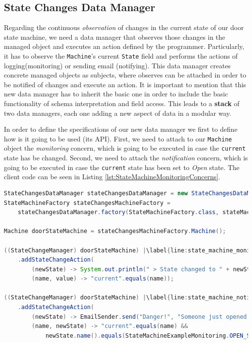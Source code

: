 \subsection{State Changes Data Manager}
Regarding the continuous \textit{observation} of changes in the current state of our door state machine, we need a data manager that observes those changes in the managed object and executes an action defined by the programmer.
Particularly, it has to observe the \texttt{Machine}'s current \texttt{State} field and performs the actions of logging(monitoring) or sending email (notifying).
This data manager creates concrete managed objects as subjects, where observes can be attached in order to be notified of changes and execute an action.
It is important to mention that this new data manager has to inherit the basic one in order to include the basic functionality of schema interpretation and field access.
This leads to a \textbf{stack} of two data managers, each one adding a new aspect of data in a modular way.

In order to define the specifications of our new data manager we first to define how is it going to be used (its API).
First, we need to attach to our \texttt{Machine} object the \textit{monitoring} concern, which is going to be executed in case the \texttt{current} state has be changed.
Second, we need to attach the \textit{notification} concern, which is going to be executed in case the \texttt{current} state has been set to \textit{Open} state.
The client code can be seen in Listing \ref{lst:StateMachineMonitoringConcerns}.

\begin{sourcecode} [H]
	\begin{lstlisting}[language=Java, escapechar=|]
StateChangesDataManager stateChangesDataManager = new StateChangesDataManager();
StateMachineFactory stateChangesMachineFactory = 
	stateChangesDataManager.factory(StateMachineFactory.class, stateMachineSchema);

Machine doorStateMachine = stateChangesMachineFactory.Machine();

((StateChangeManager) doorStateMachine) |\label{line:state_machine_monitor}|
	.addStateChangeAction(
		(newState) -> System.out.println(" > State changed to " + newState.name()),
		(name, value) -> "current".equals(name));

((StateChangeManager) doorStateMachine) |\label{line:state_machine_notify}|
	.addStateChangeAction(
		(newState) -> EmailSender.send("Danger!", "Someone just opened the door!"),
		(name, newState) -> "current".equals(name) &&
			newState.name().equals(StateMachineExampleMonitoring.OPEN_STATE));
	\end{lstlisting}
	\caption{Door state machine with concerns}
	\label{lst:StateMachineMonitoringConcerns}
\end{sourcecode}

